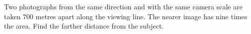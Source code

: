 Two photographs from the same direction and with the same camera scale are taken 700 metres apart along the viewing line. The nearer image has nine times the area. Find the farther distance from the subject.
